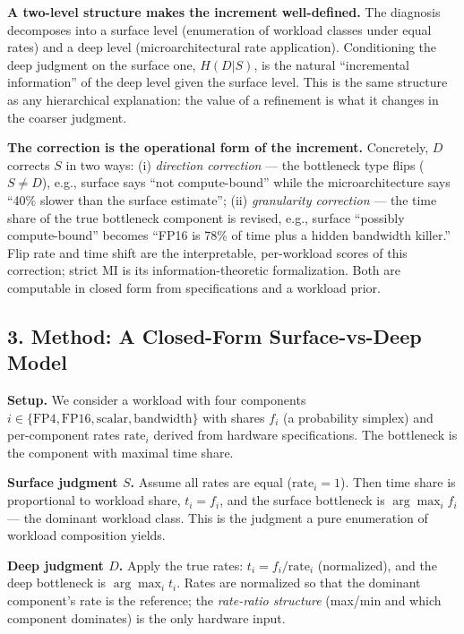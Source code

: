 \documentclass[11pt]{article}
\begin{document}
\textbf{A two-level structure makes the increment well-defined.} The diagnosis decomposes into a surface level (enumeration of workload classes under equal rates) and a deep level (microarchitectural rate application). Conditioning the deep judgment on the surface one, \(H(D|S)\), is the natural ``incremental information'' of the deep level given the surface level. This is the same structure as any hierarchical explanation: the value of a refinement is what it changes in the coarser judgment.

\textbf{The correction is the operational form of the increment.} Concretely, \(D\) corrects \(S\) in two ways: (i) \emph{direction correction} --- the bottleneck type flips (\(S \neq D\)), e.g., surface says ``not compute-bound'' while the microarchitecture says ``40\% slower than the surface estimate''; (ii) \emph{granularity correction} --- the time share of the true bottleneck component is revised, e.g., surface ``possibly compute-bound'' becomes ``FP16 is 78\% of time plus a hidden bandwidth killer.'' Flip rate and time shift are the interpretable, per-workload scores of this correction; strict MI is its information-theoretic formalization. Both are computable in closed form from specifications and a workload prior.

\subsection{3. Method: A Closed-Form Surface-vs-Deep Model}\label{method-a-closed-form-surface-vs-deep-model}

\textbf{Setup.} We consider a workload with four components \(i \in \{\text{FP4}, \text{FP16}, \text{scalar}, \text{bandwidth}\}\) with shares \(f_i\) (a probability simplex) and per-component rates \(\text{rate}_i\) derived from hardware specifications. The bottleneck is the component with maximal time share.

\textbf{Surface judgment \(S\).} Assume all rates are equal (\(\text{rate}_i = 1\)). Then time share is proportional to workload share, \(t_i = f_i\), and the surface bottleneck is \(\arg\max_i f_i\) --- the dominant workload class. This is the judgment a pure enumeration of workload composition yields.

\textbf{Deep judgment \(D\).} Apply the true rates: \(t_i = f_i / \text{rate}_i\) (normalized), and the deep bottleneck is \(\arg\max_i t_i\). Rates are normalized so that the dominant component's rate is the reference; the \emph{rate-ratio structure} (max/min and which component dominates) is the only hardware input.
\end{document}
